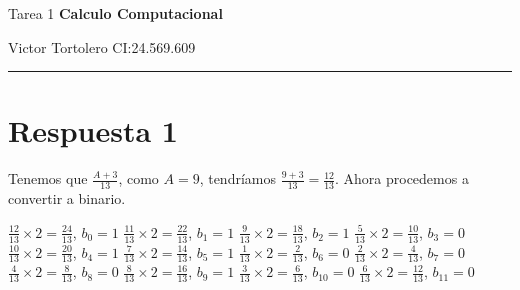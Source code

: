 \documentclass{article}
\begin{document}
\flushleft
\setlength{\parindent}{20pt}

\justify
\centerline{\huge Tarea 1 \textbf{Calculo Computacional}}
\centerline{Victor Tortolero CI:24.569.609}  %
\vspace{0.1cm}
\hrule

\section*{Respuesta 1}
Tenemos que $\frac{A + 3}{13}$, como $A = 9$, tendríamos $\frac{9 + 3}{13} = \frac{12}{13}$.
Ahora procedemos a convertir a binario. \newline
\begin{multicols}{2}
	$\frac{12}{13} \times 2 = \frac{24}{13}$, $b_{0} = 1$ \newline
	$\frac{11}{13} \times 2 = \frac{22}{13}$, $b_{1} = 1$ \newline
	$\frac{9}{13} \times 2 = \frac{18}{13}$, $b_{2} = 1$ \newline
	$\frac{5}{13} \times 2 = \frac{10}{13}$, $b_{3} = 0$ \newline
	$\frac{10}{13} \times 2 = \frac{20}{13}$, $b_{4} = 1$ \newline
	$\frac{7}{13} \times 2 = \frac{14}{13}$, $b_{5} = 1$ \newline
	$\frac{1}{13} \times 2 = \frac{2}{13}$, $b_{6} = 0$ \newline
	$\frac{2}{13} \times 2 = \frac{4}{13}$, $b_{7} = 0$ \newline
	$\frac{4}{13} \times 2 = \frac{8}{13}$, $b_{8} = 0$ \newline
	$\frac{8}{13} \times 2 = \frac{16}{13}$, $b_{9} = 1$ \newline
	$\frac{3}{13} \times 2 = \frac{6}{13}$, $b_{10} = 0$ \newline
	$\frac{6}{13} \times 2 = \frac{12}{13}$, $b_{11} = 0$ \newline
\end{multicols}
\end{document}
